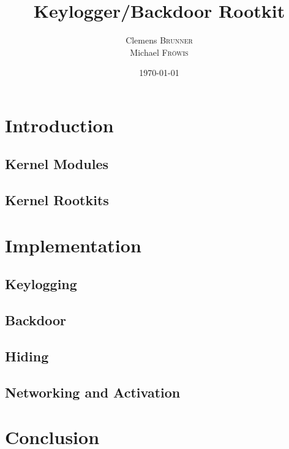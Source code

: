 \documentclass[a4paper,12pt,oneside]{article}
\title{Keylogger/Backdoor Rootkit} %
\author{Clemens \textsc{Brunner}\\
        Michael \textsc{Fröwis}} %
\date{\today} %
\begin{document}
\maketitle %
\thispagestyle{empty}
\newpage
\tableofcontents
\thispagestyle{empty}



\section{Introduction}


\subsection{Kernel Modules}

\subsection{Kernel Rootkits}

\section{Implementation}
\subsection{Keylogging}
\subsection{Backdoor}
\subsection{Hiding}
\subsection{Networking and Activation}

\section{Conclusion}
\end{document}
